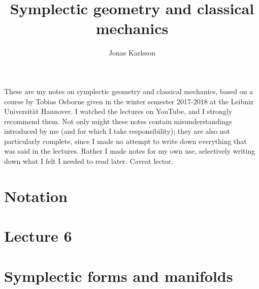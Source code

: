 \documentclass[11pt]{article} %
\title{Symplectic geometry and classical mechanics}
\author{Jonas Karlsson}
\begin{document}
\maketitle
These are my notes on symplectic geometry and classical mechanics, based on a course by Tobias Osborne given in the winter semester 2017-2018 at the Leibniz Universität Hannover. I watched the lectures on YouTube, and I strongly recommend them. Not only might these notes contain misunderstandings introduced by me (and for which I take responsibility); they are also not particularly complete, since I made no attempt to write down everything that was said in the lectures. Rather I made notes for my own use, selectively writing down what I felt I needed to read later. Caveat lector.

\section*{Notation}

\section*{}

\section*{}

\section*{}

\section*{Lecture 6}

\section*{}

\section*{Symplectic forms and manifolds}
\end{document}
